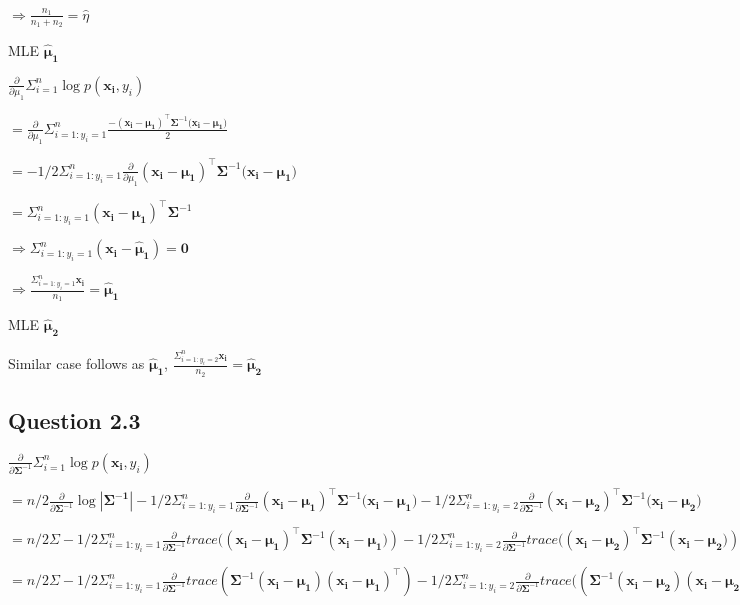 \documentclass[
]{article}
\begin{document}
\(\Rightarrow \frac{n_1}{n_1 + n_2} = \hat\eta\)

MLE \(\mathbf{\hat\mu_1}\)

\(\frac{\partial}{\partial \mu_1} \Sigma_{i=1}^n \log p(\mathbf{x_i}, y_i)\)

\(=\frac{\partial}{\partial \mu_1} \Sigma_{i=1:y_i=1}^n\frac{-(\mathbf{x_i-\mu_1})^\top \mathbf{\Sigma}^{-1} (\mathbf{x_i-\mu_1)}}{2}\)

\(=- 1/2 \Sigma_{i=1:y_i=1}^n \frac{\partial}{\partial \mu_1}(\mathbf{x_i-\mu_1})^\top \mathbf{\Sigma}^{-1} (\mathbf{x_i-\mu_1)}\)

\(=\Sigma_{i=1:y_i=1}^n (\mathbf{x_i-\mu_1})^\top \mathbf{\Sigma}^{-1}\)

\(\Rightarrow \Sigma_{i=1:y_i=1}^n (\mathbf{x_i-\hat \mu_1}) = \mathbf{0}\)

\(\Rightarrow \frac{\Sigma_{i=1:y_i=1}^n\mathbf{x_i}}{n_1} = \mathbf{\hat \mu_1}\)

MLE \(\mathbf{\hat\mu_2}\)

Similar case follows as \(\mathbf{\hat\mu_1}\),
\(\frac{\Sigma_{i=1:y_i=2}^n\mathbf{x_i}}{n_2} = \mathbf{\hat\mu_2}\)

\hypertarget{question-2.3}{%
\subsection{Question 2.3}\label{question-2.3}}

\(\frac{\partial}{\partial\mathbf{\Sigma}^{-1}} \Sigma_{i=1}^n \log p(\mathbf{x_i}, y_i)\)

\(=n/2\frac{\partial}{\partial\mathbf{\Sigma}^{-1}}\log|\mathbf{\Sigma^{-1}}| -1/2 \Sigma_{i=1:y_i=1}^n\frac{\partial}{\partial\mathbf{\Sigma}^{-1}}(\mathbf{x_i-\mu_1})^\top \mathbf{\Sigma}^{-1} (\mathbf{x_i-\mu_1)} -1/2 \Sigma_{i=1:y_i=2}^n\frac{\partial}{\partial\mathbf{\Sigma}^{-1}}(\mathbf{x_i-\mu_2})^\top \mathbf{\Sigma}^{-1} (\mathbf{x_i-\mu_2)}\)

\(=n/2\Sigma -1/2 \Sigma_{i=1:y_i=1}^n \frac{\partial}{\partial\mathbf{\Sigma}^{-1}}trace((\mathbf{x_i-\mu_1})^\top \mathbf{\Sigma}^{-1} (\mathbf{x_i-\mu_1)}) -1/2 \Sigma_{i=1:y_i=2}^n \frac{\partial}{\partial\mathbf{\Sigma}^{-1}}trace((\mathbf{x_i-\mu_2})^\top \mathbf{\Sigma}^{-1} (\mathbf{x_i-\mu_2)})\)

\(=n/2\Sigma -1/2 \Sigma_{i=1:y_i=1}^n \frac{\partial}{\partial\mathbf{\Sigma}^{-1}}trace(\mathbf{\Sigma}^{-1} (\mathbf{x_i-\mu_1})(\mathbf{x_i-\mu_1})^\top) -1/2 \Sigma_{i=1:y_i=2}^n \frac{\partial}{\partial\mathbf{\Sigma}^{-1}}trace(( \mathbf{\Sigma}^{-1} (\mathbf{x_i-\mu_2})(\mathbf{x_i-\mu_2})^\top)\)
\end{document}
